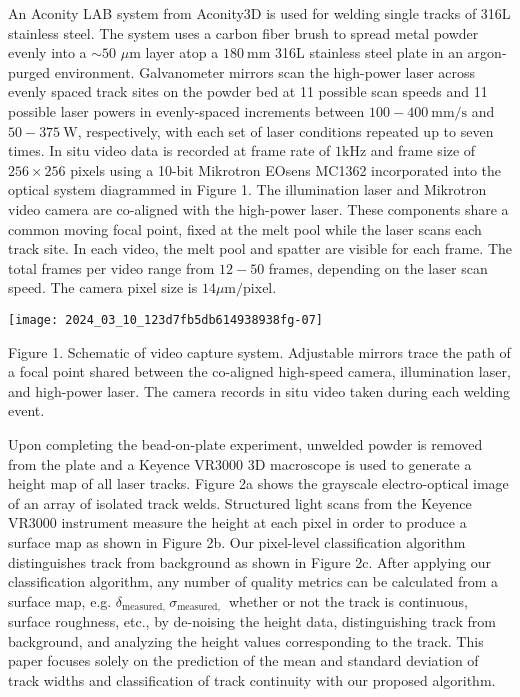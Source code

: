 \documentclass[10pt]{article}
\begin{document}
An Aconity LAB system from Aconity3D is used for welding single tracks of 316L stainless steel. The system uses a carbon fiber brush to spread metal powder evenly into a $\sim 50$ $\mu \mathrm{m}$ layer atop a $180 \mathrm{~mm}$ 316L stainless steel plate in an argon-purged environment. Galvanometer mirrors scan the high-power laser across evenly spaced track sites on the powder bed at 11 possible scan speeds and 11 possible laser powers in evenly-spaced increments between $100-400 \mathrm{~mm} / \mathrm{s}$ and $50-375 \mathrm{~W}$, respectively, with each set of laser conditions repeated up to seven times. In situ video data is recorded at frame rate of $1 \mathrm{kHz}$ and frame size of $256 \times 256$ pixels using a 10-bit Mikrotron EOsens MC1362 incorporated into the optical system diagrammed in Figure 1. The illumination laser and Mikrotron video camera are co-aligned with the high-power laser. These components share a common moving focal point, fixed at the melt pool while the laser scans each track site. In each video, the melt pool and spatter are visible for each frame. The total frames per video range from $12-50$ frames, depending on the laser scan speed. The camera pixel size is $14 \mu \mathrm{m} / \mathrm{pixel}$.

\begin{center}
\texttt{[image: 2024\_03\_10\_123d7fb5db614938938fg-07]}
\end{center}

Figure 1. Schematic of video capture system. Adjustable mirrors trace the path of a focal point shared between the co-aligned high-speed camera, illumination laser, and high-power laser. The camera records in situ video taken during each welding event.

Upon completing the bead-on-plate experiment, unwelded powder is removed from the plate and a Keyence VR3000 3D macroscope is used to generate a height map of all laser tracks. Figure 2a shows the grayscale electro-optical image of an array of isolated track welds. Structured light scans from the Keyence VR3000 instrument measure the height at each pixel in order to produce a surface map as shown in Figure 2b. Our pixel-level classification algorithm distinguishes track from background as shown in Figure 2c. After applying our classification algorithm, any number of quality metrics can be calculated from a surface map, e.g. $\delta_{\text {measured, }} \sigma_{\text {measured, }}$ whether or not the track is continuous, surface roughness, etc., by de-noising the height data, distinguishing track from background, and analyzing the height values corresponding to the track. This paper focuses solely on the prediction of the mean and standard deviation of track widths and classification of track continuity with our proposed algorithm.
\end{document}
